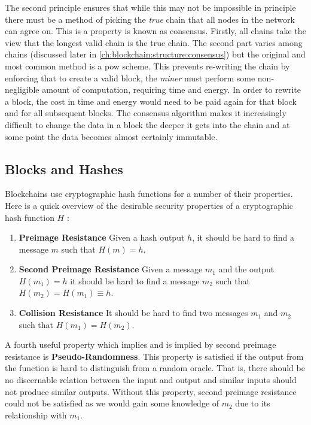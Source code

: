 The second principle ensures that while this may not be impossible in principle there must be a method of picking the \emph{true} chain that all nodes in the network can agree on. This is a property is known as consensus. Firstly, all chains take the view that the longest valid chain is the true chain. The second part varies among chains (discussed later in \autoref{ch:blockchain:structure:consensus}) but the original and most common method is a \gls{pow} scheme. This prevents re-writing the chain by enforcing that to create a valid block, the \emph{miner} must perform some non-negligible amount of computation, requiring time and energy. In order to rewrite a block, the cost in time and energy would need to be paid again for that block and for all subsequent blocks. The consensus algorithm makes it increasingly difficult to change the data in a block the deeper it gets into the chain and at some point the data becomes almost certainly immutable.

\subsection{Blocks and Hashes}
\label{ch:blockchain:structure:basics}

Blockchains use cryptographic hash functions for a number of their properties. Here is a quick overview of the desirable security properties of a cryptographic hash function $H$ \cite{martinEverydayCryptography2017}:

\begin{enumerate}
    \item \textbf{Preimage Resistance} Given a hash output $h$, it should be hard to find a message $m$ such that $H(m) = h$.
    \item \textbf{Second Preimage Resistance} Given a message $m_1$ and the output $H(m_1) = h$ it should be hard to find a message $m_2$ such that $H(m_2) = H(m_1) \equiv h$.
    \item \textbf{Collision Resistance} It should be hard to find two messages $m_1$ and $m_2$ such that $H(m_1) = H(m_2)$.
\end{enumerate}

A fourth useful property which implies and is implied by second preimage resistance is \textbf{Pseudo-Randomness}. This property is satisfied if the output from the function is hard to distinguish from a random oracle. That is, there should be no discernable relation between the input and output and similar inputs should not produce similar outputs. Without this property, second preimage resistance could not be satisfied as we would gain some knowledge of $m_2$ due to its relationship with $m_1$.

